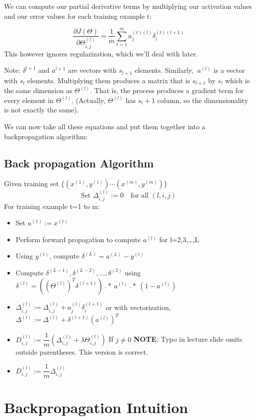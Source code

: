 We can compute our partial derivative terms by multiplying our activation values and our error values for each training example t:

$$\dfrac{\partial J(\Theta)}{\partial \Theta_{i,j}^{(l)}} = \frac{1}{m}\sum_{t=1}^m a_j^{(t)(l)} {\delta}_i^{(t)(l+1)} $$
This however ignores regularization, which we'll deal with later.

Note: $\delta^{l+1}$ and $a^{l+1}$ are vectors with $s_{l+1}$ elements. Similarly, $\ a^{(l)}$ is a vector with $s_l$ elements. Multiplying them produces a matrix that is $s_{l+1}$ by $s_l$ which is the same dimension as $\Theta^{(l)}$. That is, the process produces a gradient term for every element in $\Theta^{(l)}$. (Actually, $\Theta^{(l)}$ has $s_{l} + 1$ column, so the dimensionality is not exactly the same).

We can now take all these equations and put them together into a backpropagation algorithm:

\subsection{Back propagation Algorithm}
Given training set $\lbrace (x^{(1)}, y^{(1)}) \cdots (x^{(m)}, y^{(m)})\rbrace$
$$\text{Set } \Delta^{(l)}_{i,j} := 0\quad \text{for all } (l,i,j) $$
For training example t=1 to m:
\begin{itemize}
	\item Set $a^{(1)} := x^{(t)}$
	\item Perform forward propagation to compute $a^{(l)}$ for l=2,3,…,L
	\item Using $y^{(t)}$, compute $\delta^{(L)} = a^{(L)} - y^{(t)}$
	\item Compute $\delta^{(L-1)}, \delta^{(L-2)},\dots,\delta^{(2)}$ using $\delta^{(l)} = ((\Theta^{(l)})^T \delta^{(l+1)})\ .*\ a^{(l)}\ .*\ (1 - a^{(l)})$
	\item $\Delta^{(l)}_{i,j} := \Delta^{(l)}_{i,j} + a_j^{(l)} \delta_i^{(l+1)}$ or with vectorization,$ \Delta^{(l)} := \Delta^{(l)} + \delta^{(l+1)}(a^{(l)})^T$
	\item $ D^{(l)}_{i,j} := \dfrac{1}{m}\left(\Delta^{(l)}_{i,j} + \lambda\Theta^{(l)}_{i,j}\right)$ If $j \neq 0$ \textbf{NOTE}: Typo in lecture slide omits outside parentheses. This version is correct.
	\item $ D^{(l)}_{i,j} := \dfrac{1}{m}\Delta^{(l)}_{i,j}$
\end{itemize}

\section{Backpropagation Intuition}